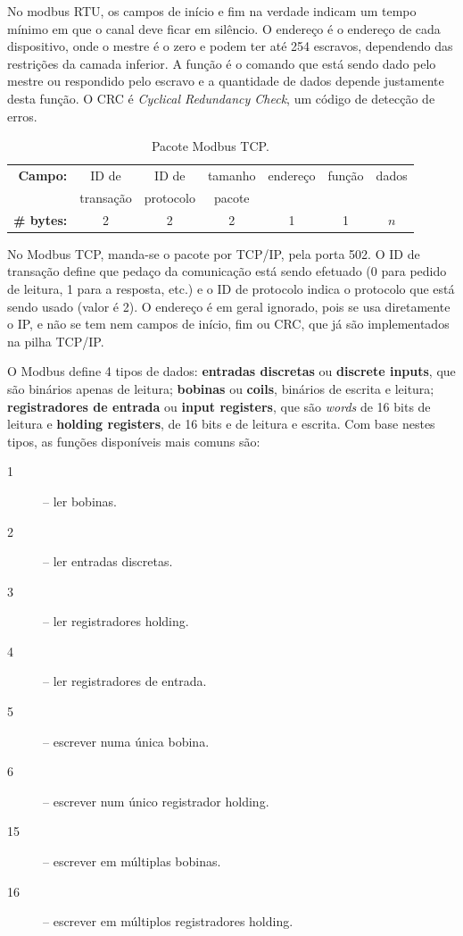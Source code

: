 No modbus RTU, os campos de início e fim na verdade indicam um tempo mínimo em que o canal deve ficar em silêncio. O endereço é o endereço de cada dispositivo, onde o mestre é o zero e podem ter até 254 escravos, dependendo das restrições da camada inferior. A função é o comando que está sendo dado pelo mestre ou respondido pelo escravo e a quantidade de dados depende justamente desta função. O CRC é \emph{Cyclical Redundancy Check}, um código de detecção de erros.

\begin{table}
    \centering
    \caption{Pacote Modbus TCP.}\label{tab:mbtcp}
    \begin{tabular}{r|c|c|c|c|c|c|}
        \cline{2-7}
        \textbf{Campo:} & ID de & ID de & tamanho & endereço & função & dados \\
         & transação & protocolo & pacote &  &  &  \\
        \cline{2-7}
        \textbf{\# bytes:} & 2 & 2 & 2 & 1 & 1 & $n$ \\
        \cline{2-7}
    \end{tabular}
\end{table}

No Modbus TCP, manda-se o pacote por TCP/IP, pela porta 502. O ID de transação define que pedaço da comunicação está sendo efetuado (0 para pedido de leitura, 1 para a resposta, etc.) e o ID de protocolo indica o protocolo que está sendo usado (valor é 2). O endereço é em geral ignorado, pois se usa diretamente o IP, e não se tem nem campos de início, fim ou CRC, que já são implementados na pilha TCP/IP.

O Modbus define 4 tipos de dados: \textbf{entradas discretas} ou \textbf{discrete inputs}, que são binários apenas de leitura; \textbf{bobinas} ou \textbf{coils}, binários de escrita e leitura; \textbf{registradores de entrada} ou \textbf{input registers}, que são \emph{words} de 16 bits de leitura e \textbf{holding registers}, de 16 bits e de leitura e escrita. Com base nestes tipos, as funções disponíveis mais comuns são:
\begin{description}
    \item[1] -- ler bobinas.
    \item[2] -- ler entradas discretas.
    \item[3] -- ler registradores holding.
    \item[4] -- ler registradores de entrada.
    \item[5] -- escrever numa única bobina.
    \item[6] -- escrever num único registrador holding.
    \item[15] -- escrever em múltiplas bobinas.
    \item[16] --  escrever em múltiplos registradores holding.
\end{description}


